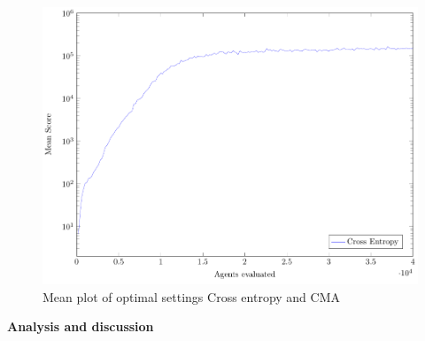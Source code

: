 \begin{figure}[H]
\centering
\includegraphics[scale=0.8]{data/TunedComparison/mean_CE_CMA/PlotFile.pdf}
\caption{Mean plot of optimal settings Cross entropy and CMA}
\end{figure}


\textbf{Analysis and discussion}\\

